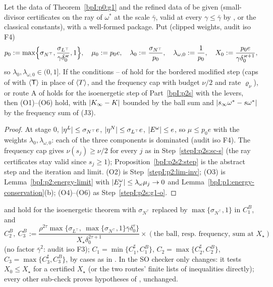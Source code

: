 \begin{theorem}\label{bpI:p2s2:g1}
Let the data of Theorem~\ref{bpI:p0:g1} and the refined data of  be given (small-divisor certificates on the ray of $\omega^*$ at
the scale $\bar\gamma$, valid at every $\gamma\le\bar\gamma$ by , or the classical constants), with a well-formed package. Put
(clipped weights, audit iso F4)
\[
p_0:=\max\Bigl\{\sigma_{N^\top},\frac{\sigma_{L^\top}}{\gamma\delta_0^\varkappa},1\Bigr\},\quad\mu_0:=p_0e,\quad\lambda_0:=\frac{\sigma_{N^\top}}{p_0},\quad\lambda_{\omega,0}:=\frac1{p_0},\quad
X_0:=\frac{p_0e}{\gamma\delta_0^{\varkappa+1}},
\]
so $\lambda_0,\lambda_{\omega,0}\in(0,1]$. If the conditions -- of  hold for the bordered modified step
(caps of  with $\langle \mathsf T\rangle$ in place of $\langle T\rangle$, and the frequency cap with budget $\nu/2$ and rate $\varrho_\nu$), or route A of
 holds for the isoenergetic step of Part~\ref{bpI:p2s} with the levers, then (O1)--(O6) hold, with $\lvert K_\infty-K\rvert$ bounded by the ball sum
and $\lvert s_\infty\omega^*-s\omega^*\rvert$ by the frequency sum of (J3).
\end{theorem}

\begin{proof}
\label{stepI:p2s2:g1}
At stage $0$, $\lvert \eta^L\rvert\le\sigma_{N^\top}e$, $\lvert \eta^N\rvert\le\sigma_{L^\top}e$, $\lvert E^\omega\rvert\le e$, so $\mu\le p_0e$ with the weights $\lambda_0,\lambda_{\omega,0}$: each of the three
components is dominated (audit iso F4). The frequency cap gives $\nu(s_j)\ge\nu/2$ for every $j$ as in Step~\ref{stepI:p2s:sc-s} (the ray certificates stay valid since
$s_j\ge1$); Proposition~\ref{bpI:p2s2:step} is the abstract step and  the iteration and limit. (O2) is Step~\ref{stepI:p2:lim-inv}; (O3) is
Lemma~\ref{bpI:p2:energy-limit} with $\lvert E^\omega_j\rvert\le\lambda_\omega\mu_j\to0$ and Lemma~\ref{bpI:p1:energy-conservation}(b); (O4)--(O6) as Step~\ref{stepI:p2s:g1-o}.
\end{proof}

\begin{corollary}\label{bpI:p2s2:frozen}
 and  hold for the isoenergetic theorem with $\sigma_{N^\top}$ replaced by $\max\{\sigma_{N^\top},1\}$ in $C_1^B$, and
\[
C_2^B,\ C_3^B:=\frac{\rho^{2\tau}\max\{\sigma_{L^\top},\ \max\{\sigma_{N^\top},1\}\bar\gamma\delta_0^\tau\}}{X_\star\delta_0^{2\tau+1}}\times(\text{the ball, resp.\ frequency, sum at }X_\star)
\]
(no factor $\bar\gamma^2$: audit iso F3); $C_1=\min\{C_1^\sharp,C_1^B\}$, $C_2=\max\{C_2^\sharp,C_2^B\}$, $C_3=\max\{C_3^\sharp,C_3^B\}$, by cases as in . In
the SO checker only  changes: it tests $X_0\le X_\star$ for a certified $X_\star$ (or the two routes' finite lists of inequalities
directly); every other sub-check proves hypotheses of , unchanged.
\end{corollary}

